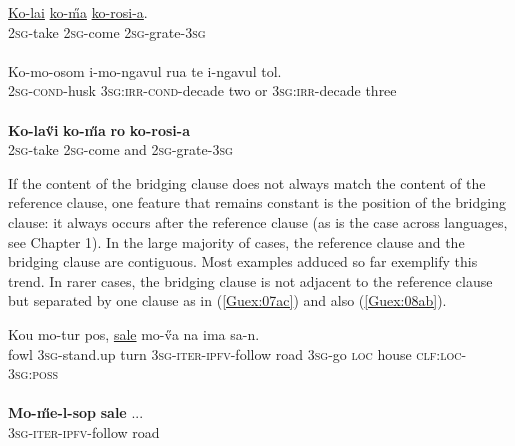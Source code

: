 \documentclass[output=paper]{LSP/langsci}
\begin{document}
\begin{exe}
\ex \label{Guex:07ac}
\begin{xlist}
\ex \label{Guex:07a}
\gll \underline{Ko-lai}   \underline{ko-\H{m}a}    \underline{ko-rosi-a}.\\
\textsc{2sg}-take   \textsc{2sg}-come   \textsc{2sg}-grate-\textsc{3sg}\\
\glt {}\\
\ex \label{Guex:07b}
\gll Ko-mo-osom  i-mo-ngavul               rua   te     i-ngavul    tol.\\
\textsc{2sg}-\textsc{cond}-husk  \textsc{3sg:irr-cond}-decade   two   or     \textsc{3sg:irr}-decade  three \\
\glt {}\\
\ex \label{Guex:07c}
\gll \textbf{Ko-la\H{v}i}  \textbf{ko-\H{m}a}  \textbf{ro}    \textbf{ko-rosi-a}\\     	       
\textsc{2sg}-take   \textsc{2sg}-come  and \textsc{2sg}-grate-\textsc{3sg}\\
\glt {} 
\end{xlist}
\end{exe}



If the content of the bridging clause does not always match the content of the reference clause, one feature that remains constant is the position of the bridging clause: it always occurs after the reference clause (as is the case across languages, see Chapter 1). In the large majority of cases, the reference clause and the bridging clause are contiguous. Most examples adduced so far exemplify this trend. In rarer cases, the bridging clause is not adjacent to the reference clause but separated by one clause as in (\ref{Guex:07ac}) and also (\ref{Guex:08ab}).

\begin{exe}
\ex \label{Guex:08ab}
\begin{xlist}
\ex \label{Guex:08a}
\gll Kou    mo-tur           pos,      \underline{}                          \underline{sale} mo-\H{v}a       na  ima          sa-n.\\
fowl   \textsc{3sg}-stand.up    turn    \textsc{3sg}-\textsc{iter}-\textsc{ipfv}-follow   road       \textsc{3sg}-go  \textsc{loc}  house  \textsc{clf:loc-3sg:poss}\\
\glt {}\\
\ex \label{Guex:08b}
\gll \textbf{Mo-\H{m}e-l-sop}  \textbf{sale}  ...\\     	       
\textsc{3sg}-\textsc{iter}-\textsc{ipfv}-follow   road\\
\glt {} 
\end{xlist}
\end{exe}
\end{document}
